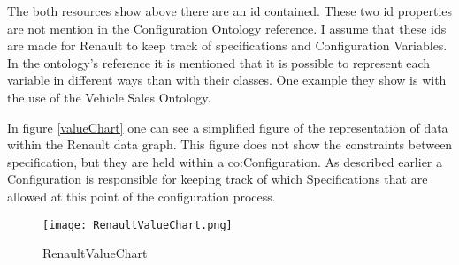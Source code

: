 The both resources show above there are an id contained. These two id properties are
not mention in the Configuration Ontology reference.\cite{confOnt}
I assume that these ids are made for Renault to keep track of specifications and Configuration Variables.
In the ontology's reference it is mentioned that it is possible to represent each variable in different
ways than with their classes. One example they show is with the use of the Vehicle Sales Ontology.

In figure \vref{valueChart} one can see a simplified figure of the representation of data within the Renault data graph.
This figure does not show the constraints between specification, but they are held within a co:Configuration. 
As described earlier a Configuration is responsible for keeping track of which Specifications that are allowed
at this point of the configuration process.

\begin{figure}
  \centering
      \texttt{[image: RenaultValueChart.png]}
  \caption{RenaultValueChart}
\end{figure}\label{valueChart}

